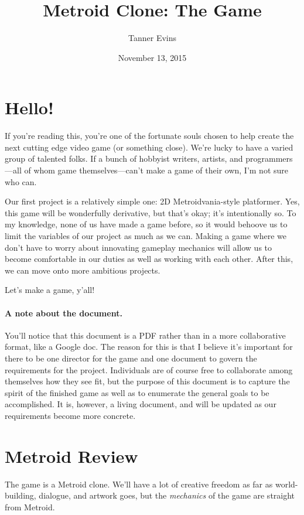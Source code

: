 \documentclass{article}
\title{Metroid Clone: The Game}
\author{Tanner Evins}
\date{November 13, 2015}
\begin{document}
\maketitle

\section{Hello!}
If you're reading this, you're one of the fortunate souls chosen to help create the next cutting edge video game (or something close). We're lucky to have a varied group of talented folks. If a bunch of hobbyist writers, artists, and programmers---all of whom game themselves---can't make a game of their own, I'm not sure who can.

Our first project is a relatively simple one: 2D Metroidvania-style platformer. Yes, this game will be wonderfully derivative, but that's okay; it's intentionally so. To my knowledge, none of us have made a game before, so it would behoove us to limit the variables of our project as much as we can. Making a game where we don't have to worry about innovating gameplay mechanics will allow us to become comfortable in our duties as well as working with each other. After this, we can move onto more ambitious projects.

Let's make a game, y'all!

\paragraph{A note about the document.} You'll notice that this document is a PDF rather than in a more collaborative format, like a Google doc. The reason for this is that I believe it's important for there to be one director for the game and one document to govern the requirements for the project. Individuals are of course free to collaborate among themselves how they see fit, but the purpose of this document is to capture the spirit of the finished game as well as to enumerate the general goals to be accomplished. It is, however, a living document, and will be updated as our requirements become more concrete.

\section{Metroid Review}
The game is a Metroid clone. We'll have a lot of creative freedom as far as world-building, dialogue, and artwork goes, but the \emph{mechanics} of the game are straight from Metroid.
\end{document}

